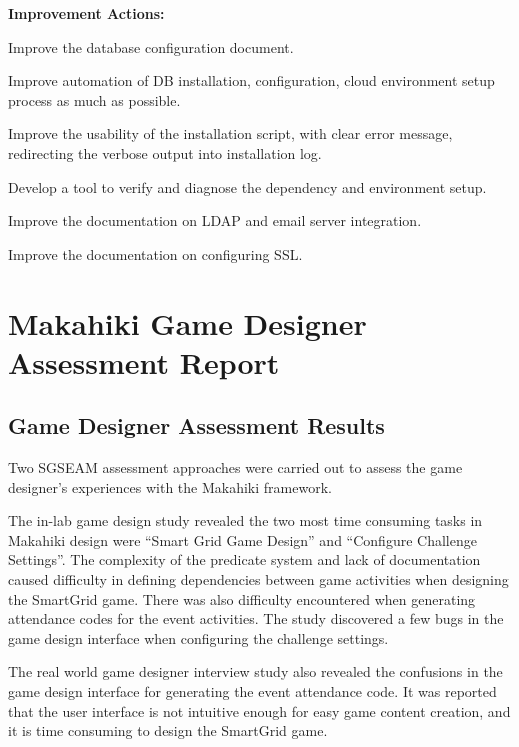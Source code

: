 \begin{table}[ht!]
\begin{shadebox}
{\bf Improvement Actions:}
\begin{compactenum}
\item Improve the database configuration document.
\item Improve automation of DB installation, configuration, cloud environment setup process as much as possible.
\item Improve the usability of the installation script, with clear error message, redirecting the verbose output into installation log.
\item Develop a tool to verify and diagnose the dependency and environment setup.
\item Improve the documentation on LDAP and email server integration.
\item Improve the documentation on configuring SSL.
\end{compactenum}
\end{shadebox}
\caption{SGSEAM Improvement Action Report from System Admin Stakeholder's Perspective}
\label{table:sysadmin-report}
\end{table}

\section{Makahiki Game Designer Assessment Report}

\subsection{Game Designer Assessment Results}

Two SGSEAM assessment approaches were carried out to assess the game designer's experiences with the Makahiki framework. 

The in-lab game design study revealed the two most time consuming tasks in Makahiki design were ``Smart Grid Game Design'' and ``Configure Challenge Settings''. The complexity of the predicate system and lack of documentation caused difficulty in defining dependencies between game activities when designing the SmartGrid game. There was also difficulty encountered when generating attendance codes for the event activities. The study discovered a few bugs in the game design interface when configuring the challenge settings.

The real world game designer interview study also revealed the confusions in the game design interface for generating the event attendance code. It was reported that the user interface is not intuitive enough for easy game content creation, and it is time consuming to design the SmartGrid game.

